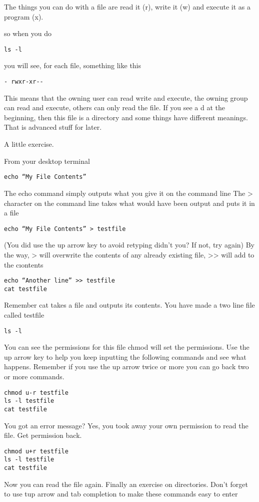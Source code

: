 \documentclass[12pt, a4paper]{article}
\begin{document}
The things you can do with a file are read it (r), write it (w) and execute it as a program (x).

so when you do
\begin{verbatim}
ls -l
\end{verbatim}

you will see, for each file, something like this
\begin{verbatim}
- rwxr-xr--
\end{verbatim}
This means that the owning user can read write and execute, the owning group can read and execute, others can only read the file.
If you see a d at the beginning, then this file is a directory and some things have different meanings. That is advanced stuff for later.

A little exercise.

From your desktop terminal
\begin{verbatim}
echo “My File Contents” 
\end{verbatim}
The echo command simply outputs what you give it on the command line
The > character on the command line takes what would have been output and puts it in a file
\begin{verbatim}
echo “My File Contents” > testfile 
\end{verbatim}
(You did use the up arrow key to avoid retyping didn’t you? If not, try again)
By the way, > will overwrite the contents of any already existing file, >> will add to the cıontents
\begin{verbatim}
echo “Another line” >> testfile
cat testfile
\end{verbatim}
Remember cat takes a file and outputs its contents.
You have made a two line file called testfile
\begin{verbatim}
ls -l
\end{verbatim}
You can see the permissions for this file
chmod will set the permissions. Use the up arrow key to help you keep inputting the following commands and see what happens. Remember if you use the up arrow twice or more you can go back two or more commands.
\begin{verbatim}
chmod u-r testfile
ls -l testfile
cat testfile
\end{verbatim}
You got an error message? Yes, you took away your own permission to read the file.
Get permission back.
\begin{verbatim}
chmod u+r testfile
ls -l testfile
cat testfile
\end{verbatim}
Now you can read the file again.
Finally an exercise on directories. Don’t forget to use tup arrow and tab completion to make these commands easy to enter
\end{document}
